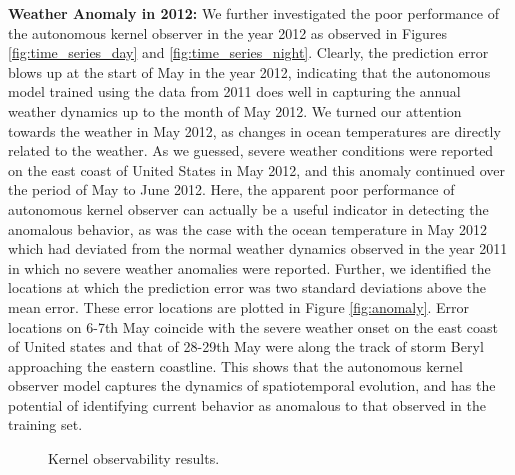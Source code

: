 \textbf{Weather Anomaly in 2012:} We further investigated the poor performance of the autonomous kernel observer in the year 2012 as observed in Figures \ref{fig:time_series_day} and \ref{fig:time_series_night}. Clearly, the prediction error blows up at the start of May in the year 2012, indicating that the autonomous model trained using the data from 2011 does well in capturing the annual weather dynamics up to the month of May 2012. We turned our attention towards the weather in May 2012, as changes in ocean temperatures are directly related to the weather. As we guessed, severe weather conditions were reported on the east coast of United States in May 2012, and this anomaly continued over the period of May to June 2012. Here, the apparent poor performance of autonomous kernel observer can actually be a useful indicator in detecting the anomalous behavior, as was the case with the ocean temperature in May 2012 which had deviated from the normal weather dynamics observed in the year 2011 in which no severe weather anomalies were reported. Further, we identified the locations at which the prediction error was two standard deviations above the mean error. These error locations are plotted in Figure \ref{fig:anomaly}. Error locations on 6-7th May coincide with the severe weather onset on the east coast of United states and that of 28-29th May were along the track of storm Beryl approaching the eastern coastline. This shows that the autonomous kernel observer model captures the dynamics of spatiotemporal evolution, and has the potential of identifying current behavior as anomalous to that observed in the training set.
 
 
\begin{figure}
\centering


	\caption{Kernel observability results.}
\end{figure} 


